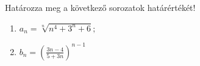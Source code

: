 \documentclass[11pt]{scrartcl}
\begin{document}
Határozza meg a következő sorozatok határértékét!
\begin{enumerate}
	\item \(\displaystyle
	      a_n = \sqrt[n]{n^4 + 3^n + 6};
	      \)

	\item \(\displaystyle
	      b_n = \left(
	      \frac{3n - 4}{5 + 3n}
	      \right)^{n - 1}
	      \)
\end{enumerate}
\end{document}
